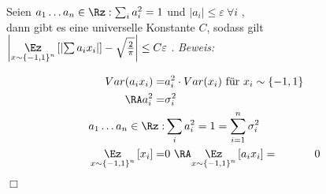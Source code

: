\documentclass{article}
\newenvironment{proof}{
	\textit{Beweis: \\}
}{
	\begin{flushright}
		$\Box$ 
	\end{flushright}
}
\begin{document}
	 \begin{thm}\label{5.16}
		 Seien $a_1 \dots a_n \in \Rz : \sum_{i} a_i^2=1$ und $\left| a_i \right| \le \varepsilon \ \forall i $ ,\\
		 dann gibt es eine universelle Konstante $C$, sodass gilt $ \left| \underset{x \sim \left\lbrace -1,1 \right\rbrace^n }{\Ez} \left[ \left| \sum a_i x_i \right| \right] -\sqrt{\frac{2}{\pi}}\right| \le C \varepsilon $ .
	 \begin{proof}
		 \begin{eqnarray*}
			 Var(a_ix_i)= & a_i^2\cdot Var(x_i)  \ \text{f\"ur} \  x_i \sim \left\lbrace -1,1 \right\rbrace \\
			  \RA a_i^2= &\sigma_i^2&  \\
			  a_1 \dots a_n \in \Rz : &\sum\limits_{i} a_i^2=1= \sum\limits_{i=1}^{n} \sigma_i^2  \\
			 \underset{x \sim \left\lbrace -1,1 \right\rbrace^n }{\Ez} \left[x_i\right]=& 0 \ \RA 
			 \underset{x \sim \left\lbrace -1,1 \right\rbrace^n }{\Ez} \left[a_i x_i\right]= & 0 
		 \end{eqnarray*} 
	 \end{proof}
	 	 \end{thm}
\end{document}
